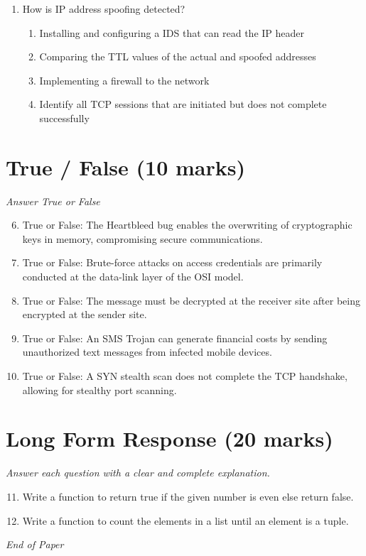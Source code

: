 \documentclass[12pt]{article}
\begin{document}
\begin{enumerate}[label=\arabic*.]
\begin{enumerate}[label=(\alph*)]
    \item crypter
    \item virus
    \item backdoor
    \item key-logger
\end{enumerate}
\item How is IP address spoofing detected?
\begin{enumerate}[label=(\alph*)]
    \item Installing and configuring a IDS that can read the IP header
    \item Comparing the TTL values of the actual and spoofed addresses
    \item Implementing a firewall to the network
    \item Identify all TCP sessions that are initiated but does not complete successfully
\end{enumerate}
\end{enumerate}

\section*{True / False (10 marks)}
\textit{Answer True or False}
\begin{enumerate}[label=\arabic*.]
\setcounter{enumi}{5}
\item True or False: The Heartbleed bug enables the overwriting of cryptographic keys in memory, compromising secure communications.
\item True or False: Brute-force attacks on access credentials are primarily conducted at the data-link layer of the OSI model.
\item True or False: The message must be decrypted at the receiver site after being encrypted at the sender site.
\item True or False: An SMS Trojan can generate financial costs by sending unauthorized text messages from infected mobile devices.
\item True or False: A SYN stealth scan does not complete the TCP handshake, allowing for stealthy port scanning.
\end{enumerate}

\section*{Long Form Response (20 marks)}
\textit{Answer each question with a clear and complete explanation.}
\begin{enumerate}[label=\arabic*.]
\setcounter{enumi}{10}
\item Write a function to return true if the given number is even else return false.
\item Write a function to count the elements in a list until an element is a tuple.
\end{enumerate}

\vfill
\noindent\textit{End of Paper}
\end{document}
